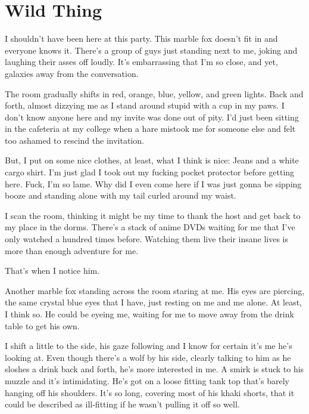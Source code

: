 
\chapter*{Wild Thing}

I shouldn't have been here at this party. This marble fox doesn't fit in
and everyone knows it. There's a group of guys just standing next to me,
joking and laughing their asses off loudly. It's embarrassing that I'm
so close, and yet, galaxies away from the conversation.

The room gradually shifts in red, orange, blue, yellow, and green
lights. Back and forth, almost dizzying me as I stand around stupid with
a cup in my paws. I don't know anyone here and my invite was done out of
pity. I'd just been sitting in the cafeteria at my college when a hare
mistook me for someone else and felt too ashamed to rescind the
invitation.

But, I put on some nice clothes, at least, what I think is nice: Jeans
and a white cargo shirt. I'm just glad I took out my fucking pocket
protector before getting here. Fuck, I'm so lame. Why did I even come
here if I was just gonna be sipping booze and standing alone with my
tail curled around my waist.

I scan the room, thinking it might be my time to thank the host and get
back to my place in the dorms. There's a stack of anime DVDs waiting for
me that I've only watched a hundred times before. Watching them live
their insane lives is more than enough adventure for me.

That's when I notice him.

Another marble fox standing across the room staring at me. His eyes are
piercing, the same crystal blue eyes that I have, just resting on me and
me alone. At least, I think so. He could be eyeing me, waiting for me to
move away from the drink table to get his own.

I shift a little to the side, his gaze following and I know for certain
it's me he's looking at. Even though there's a wolf by his side, clearly
talking to him as he sloshes a drink back and forth, he's more
interested in me. A smirk is stuck to his muzzle and it's intimidating.
He's got on a loose fitting tank top that's barely hanging off his
shoulders. It's so long, covering most of his khaki shorts, that it
could be described as ill-fitting if he wasn't pulling it off so well.


